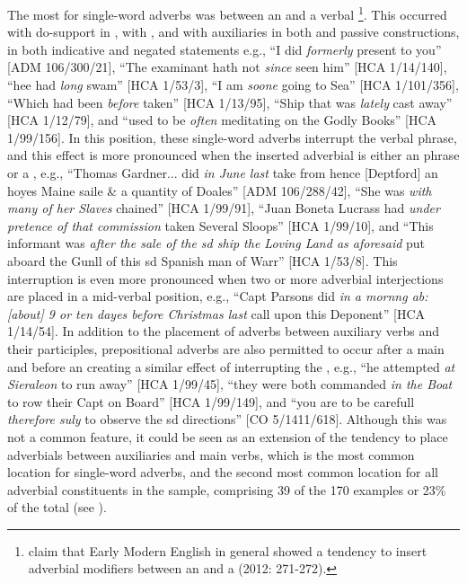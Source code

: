 The most  for single-word adverbs was between an  and a verbal \footnote{\citeauthor{MillwardHayes2012} claim that Early Modern English in general showed a tendency to insert adverbial modifiers between an  and a  (2012: 271-272).}. This occurred with do-support in , with , and with  auxiliaries in both  and passive constructions, in both indicative and negated statements e.g., “I did \textit{formerly} present to you” [ADM 106/300/21], “The examinant hath not \textit{since} seen him” [HCA 1/14/140], “hee had \textit{long} swam” [HCA 1/53/3], “I am \textit{soone} going to Sea” [HCA 1/101/356], “Which had been \textit{before} taken” [HCA 1/13/95], “Ship that was \textit{lately} cast away” [HCA 1/12/79], and “used to be \textit{often} meditating on the Godly Books” [HCA 1/99/156]. In this position, these single-word adverbs interrupt the verbal phrase, and this effect is more pronounced when the inserted adverbial is either an  phrase or a , e.g., “Thomas Gardner... did \textit{in June last} take from hence [Deptford] an hoyes Maine saile \& a quantity of Doales” [ADM 106/288/42], “She was \textit{with many of her Slaves} chained” [HCA 1/99/91],  “Juan Boneta Lucrass had \textit{under pretence of that commission} taken Several Sloops” [HCA 1/99/10], and “This informant was \textit{after the sale of the sd ship the Loving Land as aforesaid} put aboard the Gunll of this sd Spanish man of Warr” [HCA 1/53/8]. This interruption is even more pronounced when two or more adverbial interjections are placed in a mid-verbal position, e.g., “Capt Parsons did \textit{in a mornng ab:[about] 9 or ten dayes before Christmas last} call upon this Deponent” [HCA 1/14/54]. In addition to the placement of adverbs between auxiliary verbs and their participles, prepositional adverbs are also permitted to occur after a main  and before an  creating a similar effect of interrupting the , e.g., “he attempted \textit{at Sieraleon} to run away” [HCA 1/99/45], “they were both commanded \textit{in the Boat} to row their Capt on Board”  [HCA 1/99/149], and “you are to be carefull \textit{therefore suly} to observe the sd directions” [CO 5/1411/618]. Although this was not a common feature, it could be seen as an extension of the tendency to place adverbials between auxiliaries and main verbs, which is the most common location for single-word adverbs, and the second most common location for all adverbial constituents in the sample, comprising 39 of the 170 examples or 23\% of the total (see ).

